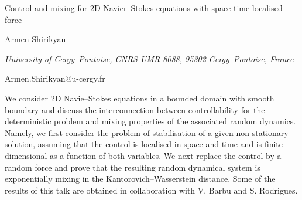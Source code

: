\documentclass[10pt,a4paper]{article}
\begin{document}
\begin{center}

{\Large Control and mixing for 2D Navier--Stokes equations with space-time localised force}

\bigskip

{\sc Armen Shirikyan}

{\small\it University of Cergy--Pontoise, CNRS UMR 8088, 95302 Cergy--Pontoise, France}

{\small\rm Armen.Shirikyan@u-cergy.fr}
\end{center}

\bigskip
We consider 2D Navie--Stokes equations in a bounded domain with smooth boundary and discuss the interconnection between controllability for the deterministic problem and mixing properties of the associated random dynamics. Namely, we first consider the problem of stabilisation of a given non-stationary solution, assuming that the control is localised in space and time and is finite-dimensional as a function of both variables. We next replace the control by a random force and prove that the resulting random dynamical system is exponentially mixing in the Kantorovich--Wasserstein distance. Some of the results of this talk are obtained in collaboration with V. Barbu and S. Rodrigues.

\bigskip
\end{document}
